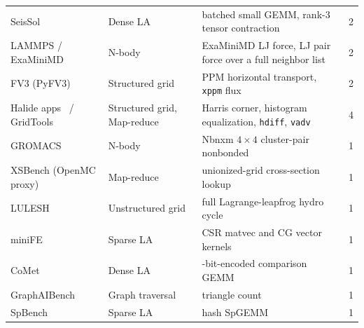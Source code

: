 \begin{widetable}[!ht]
\begin{center}
\begin{tabular}{@{}>{\raggedright\arraybackslash}p{3.6cm}>{\raggedright\arraybackslash}p{2.6cm}>{\raggedright\arraybackslash}p{6.8cm}r@{}}
SeisSol~\citep{uphoff2020seissol} & Dense LA & batched small GEMM, rank-3 tensor contraction & 2 \\
LAMMPS / ExaMiniMD~\citep{thompson2022lammps} & N-body & ExaMiniMD LJ force, LJ pair force over a full neighbor list & 2 \\
FV3 (PyFV3)~\citep{putman2007fv3} & Structured grid & PPM horizontal transport, \texttt{xppm} flux & 2 \\
Halide apps~\citep{ragankelley2013halide} / GridTools~\citep{afanasyev2021gridtools} & Structured grid, Map-reduce & Harris corner, histogram equalization, \texttt{hdiff}, \texttt{vadv} & 4 \\
GROMACS~\citep{pall2013gromacs} & N-body & Nbnxm $4{\times}4$ cluster-pair nonbonded & 1 \\
XSBench (OpenMC proxy)~\citep{tramm2014xsbench} & Map-reduce & unionized-grid cross-section lookup & 1 \\
LULESH~\citep{karlin2013lulesh} & Unstructured grid & full Lagrange-leapfrog hydro cycle & 1 \\
miniFE & Sparse LA & CSR matvec and CG vector kernels & 1 \\
CoMet~\citep{joubert2018comet} & Dense LA & 2-bit-encoded comparison GEMM & 1 \\
GraphAIBench & Graph traversal & triangle count & 1 \\
SpBench & Sparse LA & hash SpGEMM & 1 \\
\bottomrule
\end{tabular}
\end{center}
\caption{Application and proxy-application sources of  of the \rev{\releasecount{}} released kernels, with the
hotspots taken from each and their count $n$.  The kernels drawn from TSVC-2, KernelBench, and PolyBench are
counted in Table~\ref{tab:corpus} and not repeated here.}
\label{tab:selection}
\end{widetable}
